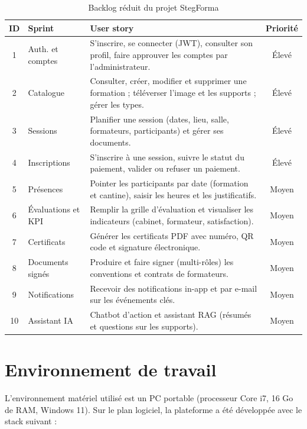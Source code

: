\documentclass[12pt,a4paper,oneside,openany]{report}
\begin{document}
\begin{table}[h]
\centering
\begin{tabular}{|c|p{3.4cm}|p{8.3cm}|c|}
\hline
\textbf{ID} & \textbf{Sprint} & \textbf{User story} & \textbf{Priorité} \\
\hline
1 & Auth. et comptes & S'inscrire, se connecter (JWT), consulter son profil, faire approuver les comptes par l'administrateur. & Élevé \\
\hline
2 & Catalogue & Consulter, créer, modifier et supprimer une formation ; téléverser l'image et les supports ; gérer les types. & Élevé \\
\hline
3 & Sessions & Planifier une session (dates, lieu, salle, formateurs, participants) et gérer ses documents. & Élevé \\
\hline
4 & Inscriptions & S'inscrire à une session, suivre le statut du paiement, valider ou refuser un paiement. & Élevé \\
\hline
5 & Présences & Pointer les participants par date (formation et cantine), saisir les heures et les justificatifs. & Moyen \\
\hline
6 & Évaluations et KPI & Remplir la grille d'évaluation et visualiser les indicateurs (cabinet, formateur, satisfaction). & Moyen \\
\hline
7 & Certificats & Générer les certificats PDF avec numéro, QR code et signature électronique. & Moyen \\
\hline
8 & Documents signés & Produire et faire signer (multi-rôles) les conventions et contrats de formateurs. & Moyen \\
\hline
9 & Notifications & Recevoir des notifications in-app et par e-mail sur les événements clés. & Moyen \\
\hline
10 & Assistant IA & Chatbot d'action et assistant RAG (résumés et questions sur les supports). & Moyen \\
\hline
\end{tabular}
\caption{Backlog réduit du projet StegForma}
\label{tab:backlog}
\end{table}

\section{Environnement de travail}

L'environnement matériel utilisé est un PC portable (processeur Core i7, 16 Go de RAM, Windows 11). Sur le plan logiciel, la plateforme a été développée avec le stack suivant :
\end{document}
